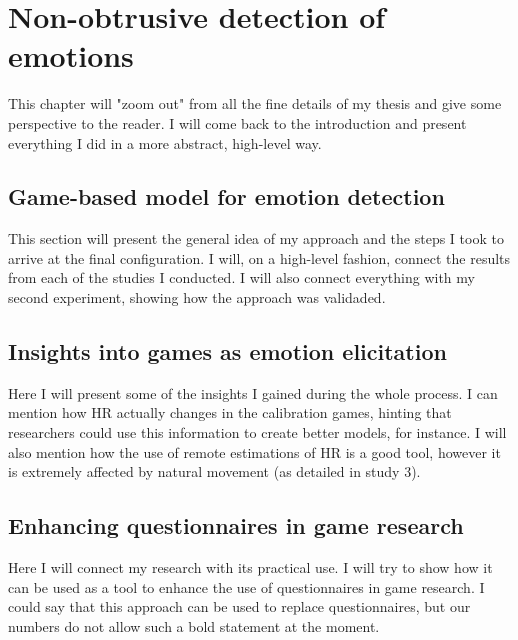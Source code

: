\chapter{Non-obtrusive detection of emotions}
\label{ch:discussion}

This chapter will "zoom out" from all the fine details of my thesis and give some perspective to the reader. I will come back to the introduction and present everything I did in a more abstract, high-level way.

\section{Game-based model for emotion detection}

This section will present the general idea of my approach and the steps I took to arrive at the final configuration. I will, on a high-level fashion, connect the results from each of the studies I conducted. I will also connect everything with my second experiment, showing how the approach was validaded.

\section{Insights into games as emotion elicitation}

Here I will present some of the insights I gained during the whole process. I can mention how HR actually changes in the calibration games, hinting that researchers could use this information to create better models, for instance. I will also mention how the use of remote estimations of HR is a good tool, however it is extremely affected by natural movement (as detailed in study 3).

\section{Enhancing questionnaires in game research}

Here I will connect my research with its practical use. I will try to show how it can be used as a tool to enhance the use of questionnaires in game research. I could say that this approach can be used to replace questionnaires, but our numbers do not allow such a bold statement at the moment.
